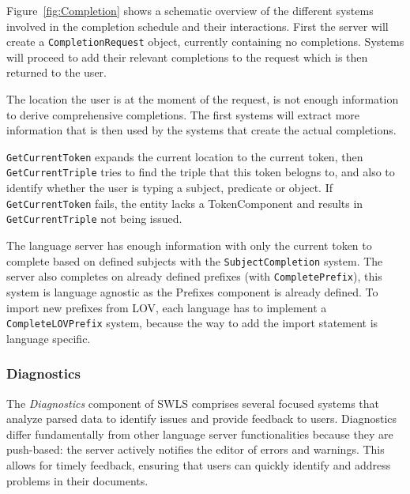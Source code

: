 Figure~\ref{fig:Completion} shows a schematic overview of the different systems involved in the completion schedule and their interactions.
First the server will create a \texttt{CompletionRequest} object, currently containing no completions.
Systems will proceed to add their relevant completions to the request which is then returned to the user.

The location the user is at the moment of the request, is not enough information to derive comprehensive completions. 
The first systems will extract more information that is then used by the systems that create the actual completions.

\texttt{GetCurrentToken} expands the current location to the current token, then \texttt{GetCurrentTriple} tries to find the triple that this token belogns to, and also to identify whether the user is typing a subject, predicate or object.
If \texttt{GetCurrentToken} fails, the entity lacks a TokenComponent and results in \texttt{GetCurrentTriple} not being issued.

The language server has enough information with only the current token to complete based on defined subjects with the \texttt{SubjectCompletion} system.
The server also completes on already defined prefixes (with \texttt{CompletePrefix}), this system is language agnostic as the Prefixes component is already defined.
To import new prefixes from LOV, each language has to implement a \texttt{CompleteLOVPrefix} system, because the way to add the import statement is language specific.


\subsubsection{Diagnostics}

The \textit{Diagnostics} component of SWLS comprises several focused systems that analyze parsed data to identify issues and provide feedback to users.
Diagnostics differ fundamentally from other language server functionalities because they are push-based: the server actively notifies the editor of errors and warnings.
This allows for timely feedback, ensuring that users can quickly identify and address problems in their documents.

